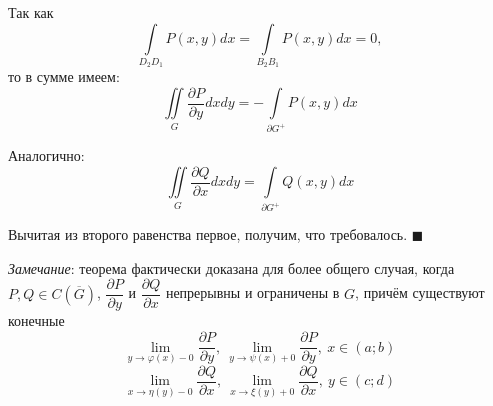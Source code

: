 \documentclass[12pt, a4paper, reqno]{article}
\begin{document}
    Так как
    \begin{equation*}
        \int\limits_{D_2D_1} P(x, y)dx = \int\limits_{B_2B_1} P(x, y)dx = 0,
    \end{equation*}
    то в сумме имеем:
    \begin{equation*}
        \iint\limits_{G}\frac{\partial P}{\partial y}dxdy = -\int\limits_{\partial G^{+}} P(x, y)dx
    \end{equation*}

    Аналогично:
    \begin{equation*}
        \iint\limits_{G}\frac{\partial Q}{\partial x}dxdy = \int\limits_{\partial G^{+}} Q(x, y)dx
    \end{equation*}

    Вычитая из второго равенства первое, получим, что требовалось.
    $\blacksquare$

    \textit{Замечание}: теорема фактически доказана для более общего случая, когда
    $P, Q \in C(\overline{G})$, $\dfrac{\partial P}{\partial y}$ и $\dfrac{\partial Q}{\partial x}$
    непрерывны и ограничены в $G$, причём существуют конечные
    \begin{equation*}
        \lim\limits_{y \to \varphi(x) - 0}\frac{\partial P}{\partial y},\
        \lim\limits_{y \to \psi(x) + 0}\frac{\partial P}{\partial y},\ x \in (a; b)
    \end{equation*}
    \begin{equation*}
        \lim\limits_{x \to \eta(y) - 0}\frac{\partial Q}{\partial x},\
        \lim\limits_{x \to \xi(y) + 0}\frac{\partial Q}{\partial x},\ y \in (c; d)
    \end{equation*}
\end{document}
